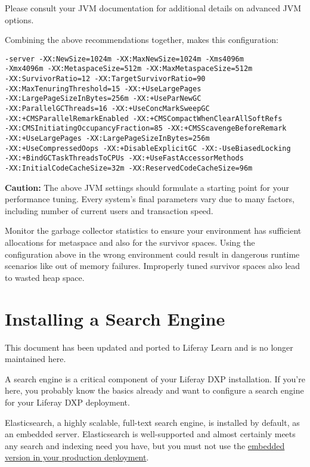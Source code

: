 Please consult your JVM documentation for additional details on advanced
JVM options.

Combining the above recommendations together, makes this configuration:

\begin{verbatim}
-server -XX:NewSize=1024m -XX:MaxNewSize=1024m -Xms4096m
-Xmx4096m -XX:MetaspaceSize=512m -XX:MaxMetaspaceSize=512m
-XX:SurvivorRatio=12 -XX:TargetSurvivorRatio=90
-XX:MaxTenuringThreshold=15 -XX:+UseLargePages 
-XX:LargePageSizeInBytes=256m -XX:+UseParNewGC 
-XX:ParallelGCThreads=16 -XX:+UseConcMarkSweepGC 
-XX:+CMSParallelRemarkEnabled -XX:+CMSCompactWhenClearAllSoftRefs
-XX:CMSInitiatingOccupancyFraction=85 -XX:+CMSScavengeBeforeRemark 
-XX:+UseLargePages -XX:LargePageSizeInBytes=256m
-XX:+UseCompressedOops -XX:+DisableExplicitGC -XX:-UseBiasedLocking
-XX:+BindGCTaskThreadsToCPUs -XX:+UseFastAccessorMethods
-XX:InitialCodeCacheSize=32m -XX:ReservedCodeCacheSize=96m
\end{verbatim}

\noindent\hrulefill

\textbf{Caution:} The above JVM settings should formulate a starting
point for your performance tuning. Every system's final parameters vary
due to many factors, including number of current users and transaction
speed.

\noindent\hrulefill

Monitor the garbage collector statistics to ensure your environment has
sufficient allocations for metaspace and also for the survivor spaces.
Using the configuration above in the wrong environment could result in
dangerous runtime scenarios like out of memory failures. Improperly
tuned survivor spaces also lead to wasted heap space.

\chapter{Installing a Search Engine}\label{installing-a-search-engine}

{This document has been updated and ported to Liferay Learn and is no
longer maintained here.}

A search engine is a critical component of your Liferay DXP
installation. If you're here, you probably know the basics already and
want to configure a search engine for your Liferay DXP deployment.

Elasticsearch, a highly scalable, full-text search engine, is installed
by default, as an embedded server. Elasticsearch is well-supported and
almost certainly meets any search and indexing need you have, but you
must not use the
\href{/docs/7-2/deploy/-/knowledge_base/d/elasticsearch\#embedded-vs-remote-operation-mode}{embedded
version in your production deployment}.

